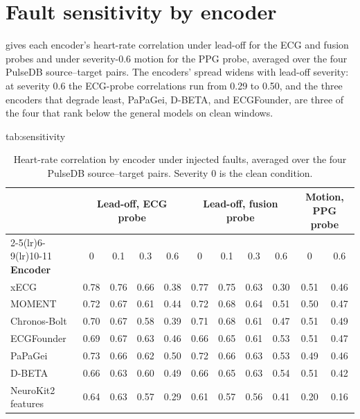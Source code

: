 \documentclass[pmlr,twocolumn,10pt]{jmlr}
\newcommand{\domainmodel}{xECG}
\newcommand{\tsmodel}{MOMENT}
\begin{document}
\section{Fault sensitivity by encoder}
\label{apx:sensitivity}

 gives each encoder's heart-rate correlation under lead-off for the ECG and fusion probes and under severity-0.6 motion for the PPG probe, averaged over the four PulseDB source--target pairs. The encoders' spread widens with lead-off severity: at severity 0.6 the ECG-probe correlations run from 0.29 to 0.50, and the three encoders that degrade least, PaPaGei, D-BETA, and ECGFounder, are three of the four that rank below the general models on clean windows.

\begin{table}[!t]
\floatconts
  {tab:sensitivity}
  {\caption{Heart-rate correlation by encoder under injected faults, averaged over the four PulseDB source--target pairs. Severity 0 is the clean condition.}}
  {\small\setlength{\tabcolsep}{4pt}
  \begin{tabular*}{\linewidth}{@{\extracolsep{\fill}}lcccccccccc@{}}
  \toprule
  & \multicolumn{4}{c}{\textbf{Lead-off, ECG probe}} & \multicolumn{4}{c}{\textbf{Lead-off, fusion probe}} & \multicolumn{2}{c}{\textbf{Motion, PPG probe}} \\
  \cmidrule(lr){2-5}\cmidrule(lr){6-9}\cmidrule(lr){10-11}
  \textbf{Encoder} & 0 & 0.1 & 0.3 & 0.6 & 0 & 0.1 & 0.3 & 0.6 & 0 & 0.6 \\
  \midrule
  \domainmodel{} & 0.78 & 0.76 & 0.66 & 0.38 & 0.77 & 0.75 & 0.63 & 0.30 & 0.51 & 0.46 \\
  \tsmodel{} & 0.72 & 0.67 & 0.61 & 0.44 & 0.72 & 0.68 & 0.64 & 0.51 & 0.50 & 0.47 \\
  Chronos-Bolt & 0.70 & 0.67 & 0.58 & 0.39 & 0.71 & 0.68 & 0.61 & 0.47 & 0.51 & 0.49 \\
  ECGFounder & 0.69 & 0.67 & 0.63 & 0.46 & 0.66 & 0.65 & 0.61 & 0.53 & 0.51 & 0.47 \\
  PaPaGei & 0.73 & 0.66 & 0.62 & 0.50 & 0.72 & 0.66 & 0.63 & 0.53 & 0.49 & 0.46 \\
  D-BETA & 0.66 & 0.63 & 0.60 & 0.49 & 0.66 & 0.65 & 0.63 & 0.54 & 0.51 & 0.42 \\
  NeuroKit2 features & 0.64 & 0.63 & 0.57 & 0.29 & 0.61 & 0.57 & 0.56 & 0.41 & 0.20 & 0.16 \\
  \bottomrule
  \end{tabular*}}
\end{table}
\end{document}
